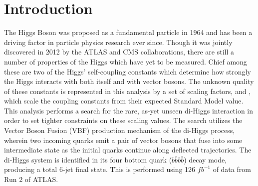 %

\chapter{Introduction}\label{chapter:introduction}

%

The Higgs Boson was proposed as a fundamental particle in 1964
    and has been a driving factor in particle physics research ever since.
Though it was jointly discovered in 2012 by the ATLAS and CMS collaborations,
    there are still a number of properties of the Higgs which have yet to be measured.
Chief among these are two of the Higgs' self-coupling constants
    which determine how strongly the Higgs interacts with both itself and with vector bosons.
The unknown quality of these constants is represented in this analysis by a set of scaling factors, \kl and \kvv,
    which scale the coupling constants from their expected Standard Model value.
This analysis performs a search for the rare,
    as-yet unseen di-Higgs interaction in order to set tighter constraints on these scaling values.
The search utilizes the Vector Boson Fusion (VBF) production mechanism of the di-Higgs process,
    wherein two incoming quarks emit a pair of vector bosons that fuse into some intermediate state
    as the initial quarks continue along deflected trajectories.
The di-Higgs system is identified in its four bottom quark ($b \bar b b \bar b$) decay mode,
    producing a total 6-jet final state.
This is performed using 126 $\textit{fb}^{-1}$ of data from Run 2 of ATLAS.

